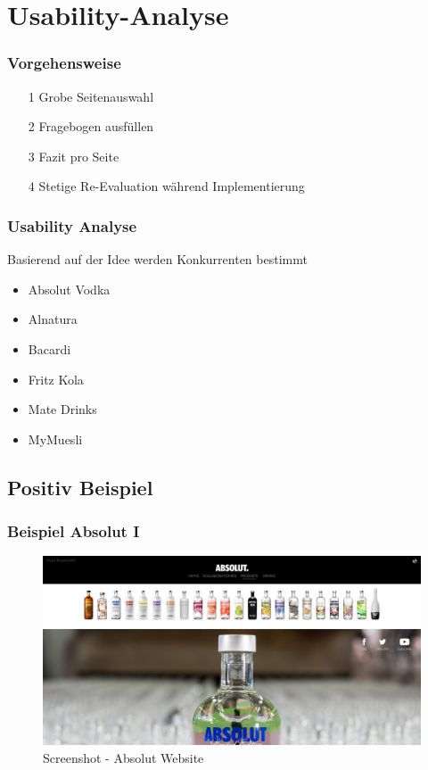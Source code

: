 \section{Usability-Analyse}
\begin{frame}
	\frametitle{Vorgehensweise}
	\begin{itemize}
		\item[1] Grobe Seitenauswahl 
		\item[2] Fragebogen ausfüllen
		\item[3] Fazit pro Seite
		\item[4] Stetige Re-Evaluation während Implementierung
	\end{itemize}
\end{frame}

\begin{frame}
	\frametitle{Usability Analyse}
	Basierend auf der Idee werden Konkurrenten bestimmt
	\begin{itemize}
		\item Absolut Vodka
		\item Alnatura
		\item Bacardi
		\item Fritz Kola
		\item Mate Drinks
		\item MyMuesli
	\end{itemize}
\end{frame}


\subsection{Positiv Beispiel}
\begin{frame}
	\frametitle{Beispiel Absolut I}
	\begin{figure}
	\includegraphics[scale=0.2]{bilder/absolut.png}
	\caption[Screenshot - Absolut Vodka]{Screenshot - Absolut Website}
	\label{labelname}
	\end{figure}
\end{frame}

